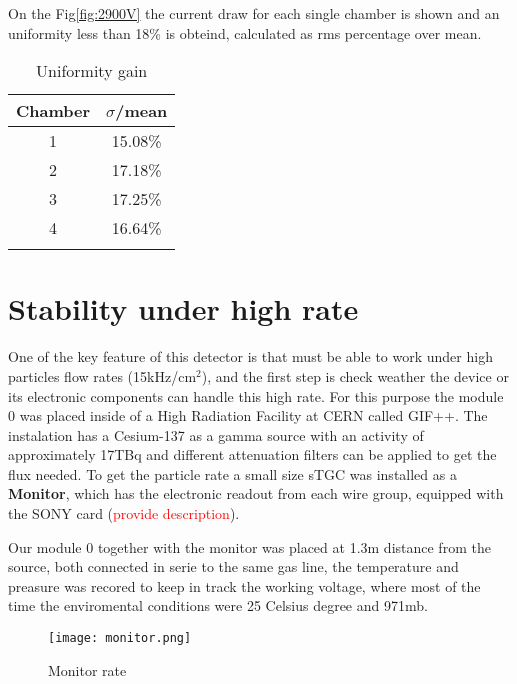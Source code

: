 On the Fig\ref{fig:2900V} the current draw for each single chamber is shown and an  uniformity less than 18\% is
obteind, calculated as rms percentage over  mean. 


\begin{table}
	\centering
	\caption{Uniformity gain}\label{table}
	\begin{tabular}{cc}
	\hline
	Chamber & $\sigma$/mean \\
	\hline
	 1 & 15.08\%  \\
	2& 17.18\%  \\
	3 & 17.25\%  \\
	4 & 16.64\%  \\
	\hline\\
	\end{tabular}
\end{table}


\section{Stability under high rate}

One of the key feature of this detector is that must be able to work under high particles flow
rates (\unit{15}{kHz/cm$^2$}), and the first step is
check weather the device or its electronic components can handle this high rate. For this purpose the module 0 was
placed inside of a High Radiation Facility at CERN called GIF++.
The instalation has a Cesium-137 as a gamma source with an activity of approximately \unit{17}{TBq} and different attenuation
filters can be applied to get the flux needed. 
To get the particle rate a small size sTGC was installed as a {\bf Monitor}, which has the electronic readout from each
wire group, equipped with the SONY card (\textcolor{red}{provide description}).

Our module 0 together with the monitor was placed at 1.3m distance from the source, both connected in serie to the same
gas line, the temperature and preasure was recored to keep in track the working voltage, where most of the time the
enviromental conditions were 25 Celsius degree and \unit{971}{mb}.\\

\begin{figure}[!hb]
	\centering
	\texttt{[image: monitor.png]}
	\caption{Monitor rate}\label{fig:monrate}
\end{figure}


